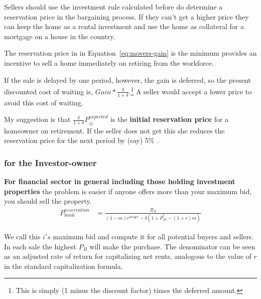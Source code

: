 {Sellers should use the investment rule calculated before  do determine a  reservation price in the bargaining process. If they can't get a higher price they  can keep the home as a rental  investment and use the home as collateral for a mortgage on a house in the country.

The reservation price in in Equation~\ref {eq:movers-gain} is the minimum provides an incentive to sell a home immediately on retiring from the workforce. 



If the sale is delayed by one period, however, the gain is deferred, so the present discounted cost of waiting is, $Gain*\frac{\delta}{1+\delta}$.\footnote{This is simply (1 minus the discount factor) times the deferred amount.} A seller would accept a lower price to avoid this cost of waiting. 

My suggestion is that $\frac{\delta}{1+\delta}P_{ij}^{expected}$ is the \textbf{initial reservation price} for a homeowner on retirement. If the seller does not get this she reduces the reservation price for the next period by (say) 5\% .


\subsubsection{for the Investor-owner}
\textbf{For financial sector in general including those holding investment properties} the problem is easier if anyone offers more than your maximum bid, you should sell the property. 
\begin{eqnarray}
P_{bank}^{reservation} & =    \frac{\mathcal{R}_N}{(1-m)r^{target}-\delta \left(1 + \dot P_M^e - (1+r)m\right)} \label{eqn-res-price-B} \end{eqnarray}

We call this  $i's$ maximum bid and compute it for all potential buyers and sellers. In each sale the highest $P_B$ will make the purchase. The denominator can be seen as an adjusted rate of return for capitalizing net rents, analogous to the value of $r$ in  the standard capitalization formula. 

}
\color{blue}
